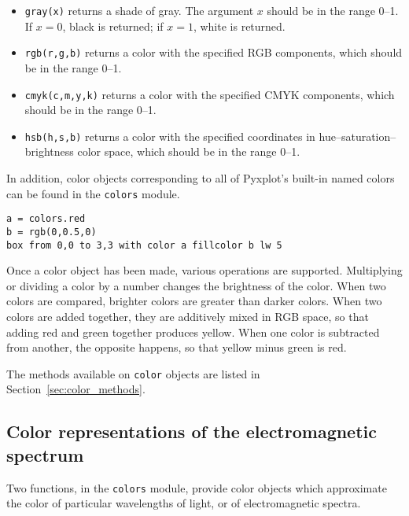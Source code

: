\begin{itemize}
\item {\tt gray(x)} returns a shade of gray. The argument $x$ should be in the range 0--1. If $x=0$, black is returned; if $x=1$, white is returned.
\item {\tt rgb(r,g,b)} returns a color with the specified RGB components, which should be in the range 0--1.
\item {\tt cmyk(c,m,y,k)} returns a color with the specified CMYK components, which should be in the range 0--1.
\item {\tt hsb(h,s,b)} returns a color with the specified coordinates in hue--saturation--brightness color space, which should be in the range 0--1.
\end{itemize}

\noindent In addition, color objects corresponding to all of Pyxplot's built-in
named colors can be found in the {\tt colors} module.

\begin{verbatim}
a = colors.red
b = rgb(0,0.5,0)
box from 0,0 to 3,3 with color a fillcolor b lw 5
\end{verbatim}

Once a color object has been made, various operations are supported.
Multiplying or dividing a color by a number changes the brightness of the
color. When two colors are compared, brighter colors are greater than darker
colors. When two colors are added together, they are additively mixed in RGB
space, so that adding red and green together produces yellow. When one color is
subtracted from another, the opposite happens, so that yellow minus green is
red.

\noindent The methods available on {\tt color} objects are listed in
Section~\ref{sec:color_methods}.

\subsection{Color representations of the electromagnetic spectrum}

Two functions, in the {\tt colors} module, provide color objects which
approximate the color of particular wavelengths of light, or of electromagnetic
spectra.


